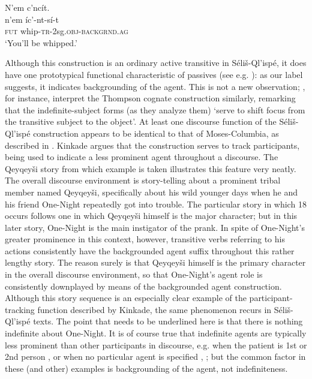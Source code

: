 \documentclass[output=paper,colorlinks,citecolor=brown]{langscibook}
\begin{document}
\ea 
\label{ex-thomason-23}
N'em {\textltilde}c'nc\'it. \\
\gll n'em \textltilde\'ic'-nt-s\'i-t\\ 
\textsc{fut} whip-\textsc{tr}-2sg.\textsc{obj-backgrnd.ag}\\
\glt  `You'll be whipped.'
\z


Although this construction is an ordinary active transitive in
S\'eli\v{s}-Ql'isp\'e, it does have one prototypical functional
characteristic of passives (see e.g. \citealt{Shibatani:1985}): as our label
suggests, it indicates backgrounding of the agent.  This is not a new
observation; \citet[58]{Thompson&Thompson:1992}, for instance, interpret
the Thompson cognate construction similarly, remarking that the
indefinite-subject forms (as they analyze them) `serve to shift focus
from the transitive subject to the object'.  At least one discourse
function of the S\'eli\v{s}-Ql'isp\'e construction appears to be
identical to that of Moses-Columbia, as described in .
Kinkade argues that the construction serves to track participants,
being used to indicate a less prominent agent throughout a discourse.
The Qeyqey\v{s}i story from which example   is taken illustrates this
feature very neatly.  The overall discourse environment is
story-telling about a prominent tribal member named Qeyqey\v{s}i,
specifically about his wild younger days when he and his friend
One-Night repeatedly got into trouble.  The particular story in which
18 occurs follows one in which Qeyqey\v{s}i himself is the major
character; but in this later story, One-Night is the main instigator
of the prank.  In spite of One-Night's greater prominence in this
context, however, transitive verbs referring to his actions
consistently have the backgrounded agent suffix throughout this rather
lengthy story.  The reason surely is that Qeyqey\v{s}i himself is the
primary character in the overall discourse environment, so that
One-Night's agent role is consistently downplayed by means of the
backgrounded agent construction.  Although this story sequence is an
especially clear example of the participant-tracking function
described by Kinkade, the same phenomenon recurs in
S\'eli\v{s}-Ql'isp\'e texts.  The point that needs to be underlined
here is that there is nothing indefinite about One-Night.  It is of
course true that indefinite agents are typically less prominent than
other participants in discourse, e.g.  when the patient is 1st or 2nd
person ,  or when no particular agent is specified , ; but
the common factor in these (and other) examples is backgrounding of
the agent, not indefiniteness.
\end{document}
